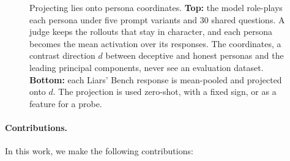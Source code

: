 \begin{figure}[t]
\centering

\caption{Projecting lies onto persona coordinates. \textbf{Top:} the model role-plays each persona
under five prompt variants and 30 shared questions. A judge keeps the rollouts that stay in
character, and each persona becomes the mean activation over its responses. The coordinates, a
contrast direction $d$ between deceptive and honest personas and the leading principal components,
never see an evaluation dataset. \textbf{Bottom:} each Liars' Bench response is mean-pooled and
projected onto $d$. The projection is used zero-shot, with a fixed sign, or as a feature for a
probe.}
\label{fig:pipeline}
\end{figure}

\paragraph{Contributions.} In this work, we make the following contributions:
